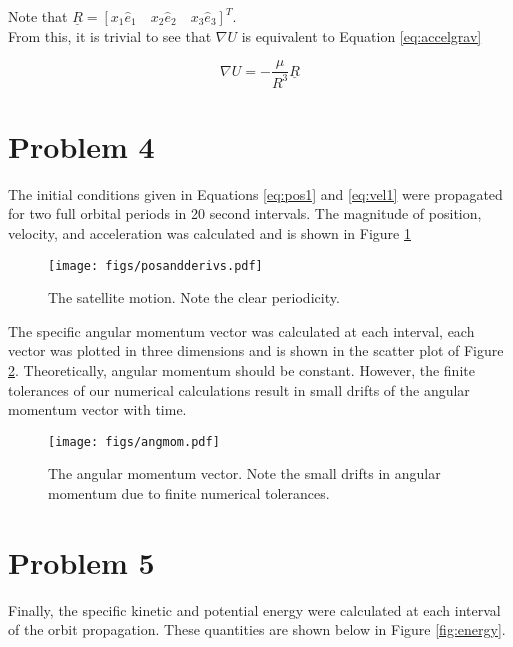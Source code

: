 \documentclass[11pt]{article}
\begin{document}
Note that $\underline{R} = \left[x_1 \hat{e}_1 \quad x_2 \hat{e}_2 \quad x_3 \hat{e}_3\right]^T$. \\

From this, it is trivial to see that $\nabla U$ is equivalent to Equation \eqref{eq:accelgrav}

\begin{equation}
	\label{eq:accelgrav}
	\nabla U = - \frac{\mu}{R^3} \underline{R}
\end{equation} 

\section{Problem 4}

The initial conditions given in Equations \eqref{eq:pos1} and \eqref{eq:vel1} were propagated for two full orbital periods in 20 second intervals. The magnitude of position, velocity, and acceleration was calculated and is shown in Figure \ref{fig:posandderiv}

\begin{figure}[h!]
	\centering
	\texttt{[image: figs/posandderivs.pdf]}
	\caption{The satellite motion. Note the clear periodicity.}
	\label{fig:posandderiv}
\end{figure}

The specific angular momentum vector was calculated at each interval, each vector was plotted in three dimensions and is shown in the scatter plot of Figure \ref{fig:angmom}. Theoretically, angular momentum should be constant. However, the finite tolerances of our numerical calculations result in small drifts of the angular momentum vector with time.

\begin{figure}[h!]
	\centering
	\texttt{[image: figs/angmom.pdf]}
	\caption{The angular momentum vector. Note the small drifts in angular momentum due to finite numerical tolerances.}
	\label{fig:angmom}
\end{figure}

\section{Problem 5}

Finally, the specific kinetic and potential energy were calculated at each interval of the orbit propagation. These quantities are shown below in Figure \ref{fig:energy}.
\end{document}
